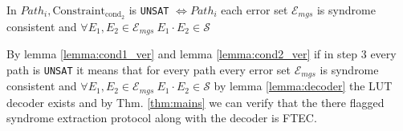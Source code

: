 \documentclass[acmsmallw,review]{acmart}
\begin{document}
\begin{lemma}
\label{lemma:cond2_ver}
    In $Path_i ,  \mathrm{Constraint}_{\mathrm{cond_2}} $ is \texttt{UNSAT} $\Leftrightarrow  Path_i$  each error set $\mathcal{E}_{mgs}$ is syndrome consistent and $\forall E_1 ,E_2 \in \mathcal{E}_{mgs} \ E_1  \cdot E_2 \in \mathcal{S}$
\end{lemma}



By lemma \ref{lemma:cond1_ver} and lemma \ref{lemma:cond2_ver} if in step 3 every path is \texttt{UNSAT} it means that  for every path  every error set $\mathcal{E}_{mgs}$ is syndrome consistent and $\forall E_1 ,E_2 \in \mathcal{E}_{mgs} \ E_1  \cdot E_2 \in \mathcal{S}$  by lemma \ref{lemma:decoder} the LUT decoder exists and by 
Thm. \ref{thm:mains} we can verify that the there  flagged syndrome extraction protocol along with the decoder is FTEC.


\iffalse
\end{document}
